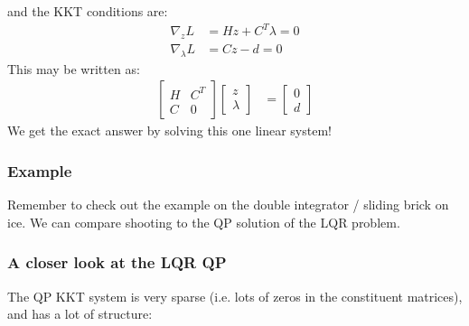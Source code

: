 and the KKT conditions are: 
\begin{align}
    \nabla_z L &= H z + C^T \lambda = 0 \\
    \nabla_{\lambda} L &= C z - d = 0
\end{align}
This may be written as:
\begin{align}
    \begin{bmatrix}
        H & C^T \\ 
        C & 0 
    \end{bmatrix}
    \begin{bmatrix}
        z \\
        \lambda
    \end{bmatrix}
    &= 
    \begin{bmatrix}
        0 \\
        d
    \end{bmatrix}
\end{align}
We get the exact answer by solving this one linear system! 

\subsubsection{Example}
Remember to check out the example on the double integrator / sliding brick on ice. We can compare shooting to the QP solution of the LQR problem. 

\subsubsection{A closer look at the LQR QP}
The QP KKT system is very sparse (i.e. lots of zeros in the constituent matrices), and has a lot of structure: 


